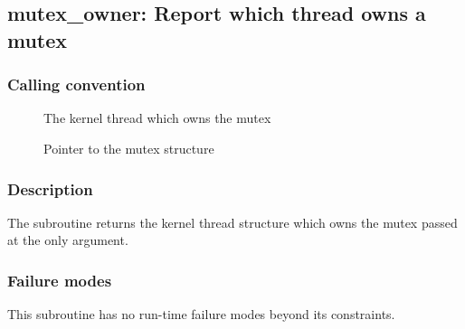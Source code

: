\clearpage
{}
{}
\label{subr:mutex_owner}
\subsection*{mutex\_owner: Report which thread owns a mutex}

\subsubsection*{Calling convention}

\begin{description}
\item[] The kernel thread which owns the mutex
\item[] Pointer to the mutex structure
\end{description}

\subsubsection*{Description}

The  subroutine returns the kernel thread
structure which owns the mutex passed at the only argument.

\subsubsection*{Failure modes}

This subroutine has no run-time failure modes beyond its constraints.
